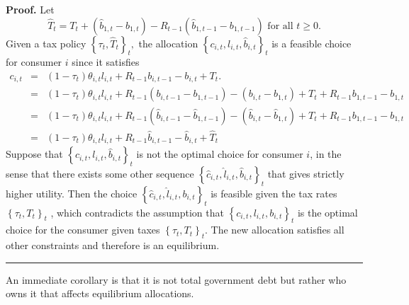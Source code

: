 \documentclass[thmsb,11pt]{article}
\newenvironment{proof}[1][Proof]{\noindent \textbf{#1.} }{\  \rule{0.5em}{0.5em}}
\begin{document}
\begin{proof}
Let
\begin{equation}
\hat{T}_{t}=T_{t} + \left(\hat{b}_{1,t} - b_{1,t}\right) -
R_{t-1}\left(\hat{b}_{1,t-1} - b_{1,t-1}\right) \text{ for
all }t\geq 0.  \label{construct That}
\end{equation}%
Given  a tax policy $\left \{ \tau _{t},\hat{T}_{t}\right \} _{t},$ the
allocation $\left \{ c_{i,t},l_{i,t},\hat{b}_{i,t}\right \}
_{t}$ is a feasible choice for consumer $i$ since it satisfies%
\begin{eqnarray*}
c_{i,t}&=&\left( 1-\tau _{t}\right) \theta _{i,t}l_{i,t}+R_{t-1}b_{i,t-1}-b_{i,t}+T_{t}.\\
&=&\left( 1-\tau _{t}\right) \theta _{i,t}l_{i,t}+R_{t-1}\left( b_{i,t-1}-b_{1,t-1}\right) -\left(
b_{i,t}-b_{1,t}\right) +T_{t}+R_{t-1}b_{1,t-1}-b_{1,t} \\
&=&\left( 1-\tau _{t}\right) \theta _{i,t}l_{i,t}+R_{t-1}\left( \hat{b}_{i,t-1}-\hat{b}_{1,t-1}\right) -\left( \hat{b%
}_{i,t}-\hat{b}_{1,t}\right) +T_{t}+R_{t-1}b_{1,t-1}-b_{1,t} \\
 &=&\left( 1-\tau _{t}\right) \theta
_{i,t}l_{i,t}+R_{t-1}\hat{b}_{i,t-1}-\hat{b}_{i,t}+\hat{T}_{t}
\end{eqnarray*}%
Suppose that $\left \{ c_{i,t},l_{i,t},\hat{b}_{i,t}\right \}
_{t}$ is not the optimal choice for consumer $i$, in the sense that there exists some
other sequence $\left \{ \hat{c}_{i,t},\hat{l}_{i,t},\hat{b}_{i,t}\right \}
_{t}$ that gives strictly higher utility.  Then the choice $%
\left \{ \hat{c}_{i,t},\hat{l}_{i,t},b_{i,t}\right \} _{t}$ is
feasible given the tax rates  $\left \{ \tau _{t},T_{t}\right \} _{t}$%
, which contradicts the assumption that $\left \{ c_{i,t},l_{i,t},b_{i,t}\right \} _{t}$ is the optimal choice for
the consumer given taxes $\left \{ \tau _{t},T_{t}\right \}
_{t}$. The new allocation satisfies all other constraints and
therefore is an equilibrium.
\end{proof}

\smallskip An immediate corollary is  that it is not
total government debt but rather who owns it that affects equilibrium
allocations.
\end{document}
